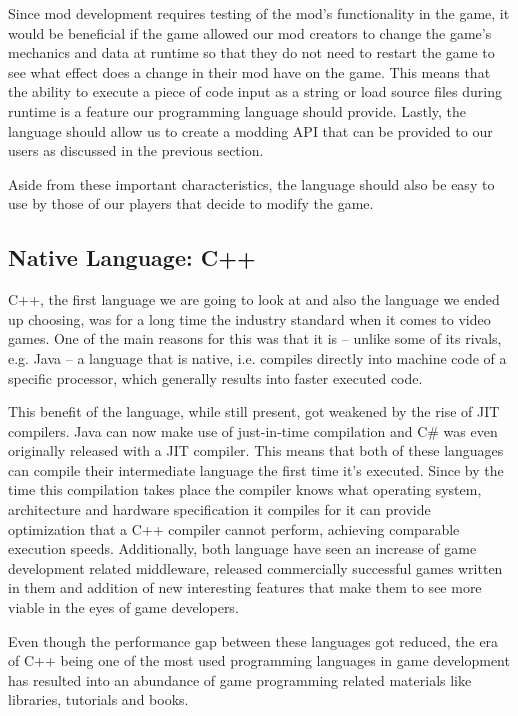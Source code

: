 Since mod development requires testing of the mod's functionality in the game, it would be beneficial if the game allowed
our mod creators to change the game's mechanics and data at runtime so that they do not need to restart the game
to see what effect does a change in their mod have on the game. This means that the ability to execute a piece of code
input as a string or load source files during runtime is a feature our programming language should provide.
Lastly, the language should allow us to create a modding API that can be provided to our users as discussed in the previous section.

Aside from these important characteristics, the language should also be easy to use by those of our players that decide to
modify the game.

\subsection{Native Language: C++}

C++, the first language we are going to look at and also the language we ended up choosing, was for a long time the
industry standard when it comes to video games. One of the main reasons for this was that it is -- unlike some of its
rivals, e.g. Java -- a language that is native, i.e. compiles directly into machine code of a specific processor, 
which generally results into faster executed code.

This benefit of the language, while still present, got weakened by the rise of JIT compilers. Java can now make use of just-in-time
compilation and C\# was even originally released with a JIT compiler. This means that both of these languages can
compile their intermediate language the first time it's executed. Since by the time this compilation takes place the
compiler knows what operating system, architecture and hardware specification it compiles for it can provide optimization that
a C++ compiler cannot perform, achieving comparable execution speeds. Additionally, both language have seen an increase of game
development related middleware, released commercially successful games written in them and addition of new interesting features
that make them to see more viable in the eyes of game developers.

Even though the performance gap between these languages got reduced, the era of C++ being one of the most used programming languages
in game development has resulted into an abundance of game programming related materials like libraries, tutorials and books.

